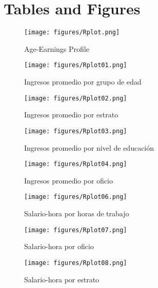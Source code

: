 \documentclass[12pt,a4paper,onecolumn]{article}
\begin{document}
\section*{Tables and Figures}

%
%
%
%
%
%


\pagebreak

\begin{figure}[H]
\caption{Age-Earnings Profile} \label{fig:robust}
    \texttt{[image: figures/Rplot.png]}   
 \flushleft
\end{figure}


\begin{figure}[H]
\caption{Ingresos promedio por grupo de edad} \label{fig:rplot1}
    \texttt{[image: figures/Rplot01.png]}   
 \flushleft
\end{figure}


\begin{figure}[H]
\caption{Ingresos promedio por estrato} \label{fig:rplot2}
    \texttt{[image: figures/Rplot02.png]}   
 \flushleft
\end{figure}



\begin{figure}[H]
\caption{Ingresos promedio por nivel de educaci\'on} \label{fig:rplot3}
    \texttt{[image: figures/Rplot03.png]}   
 \flushleft
\end{figure}


\begin{figure}[H]
\caption{Ingresos promedio por oficio} \label{fig:rplot4}
    \texttt{[image: figures/Rplot04.png]}   
 \flushleft
\end{figure}


\begin{figure}[H]
\caption{Salario-hora por horas de trabajo} \label{fig:rplot6}
    \texttt{[image: figures/Rplot06.png]}   
 \flushleft
\end{figure}



\begin{figure}[H]
\caption{Salario-hora por oficio} \label{fig:rplot7}
    \texttt{[image: figures/Rplot07.png]}   
 \flushleft
\end{figure}



\begin{figure}[H]
\caption{Salario-hora por estrato} \label{fig:rplot8}
    \texttt{[image: figures/Rplot08.png]}   
 \flushleft
\end{figure}
\end{document}
